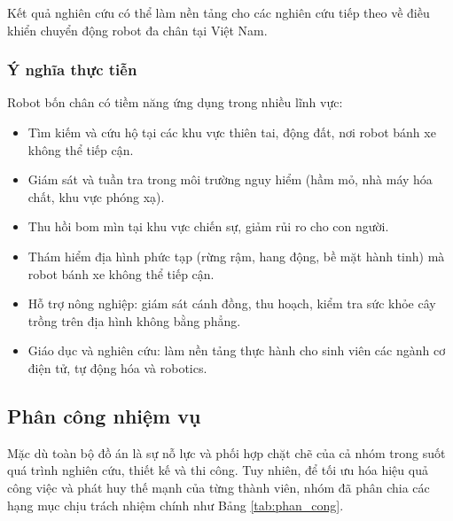 Kết quả nghiên cứu có thể làm nền tảng cho các nghiên cứu tiếp theo về điều khiển chuyển động robot đa chân tại Việt Nam.

\subsubsection{Ý nghĩa thực tiễn}
Robot bốn chân có tiềm năng ứng dụng trong nhiều lĩnh vực:
\begin{itemize}
    \item Tìm kiếm và cứu hộ tại các khu vực thiên tai, động đất, nơi robot bánh xe không thể tiếp cận.
    \item Giám sát và tuần tra trong môi trường nguy hiểm (hầm mỏ, nhà máy hóa chất, khu vực phóng xạ).
    \item Thu hồi bom mìn tại khu vực chiến sự, giảm rủi ro cho con người.
    \item Thám hiểm địa hình phức tạp (rừng rậm, hang động, bề mặt hành tinh) mà robot bánh xe không thể tiếp cận.
    \item Hỗ trợ nông nghiệp: giám sát cánh đồng, thu hoạch, kiểm tra sức khỏe cây trồng trên địa hình không bằng phẳng.
    \item Giáo dục và nghiên cứu: làm nền tảng thực hành cho sinh viên các ngành cơ điện tử, tự động hóa và robotics.
\end{itemize}

\subsection{Phân công nhiệm vụ}

Mặc dù toàn bộ đồ án là sự nỗ lực và phối hợp chặt chẽ của cả nhóm trong suốt quá trình nghiên cứu, thiết kế và thi công. Tuy nhiên, để tối ưu hóa hiệu quả công việc và phát huy thế mạnh của từng thành viên, nhóm đã phân chia các hạng mục chịu trách nhiệm chính như Bảng \ref{tab:phan_cong}.

